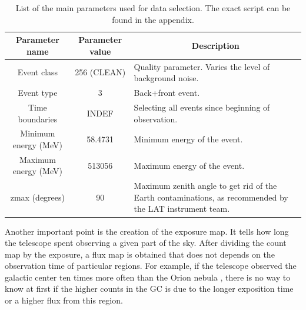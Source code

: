 \begin{center}
\begin{table}[h]
\centering
\begin{tabular}{|c|c|p{6.5cm}|}
\hline
\multicolumn{1}{|c|}{\textbf{Parameter name}} & \textbf{Parameter value} & \multicolumn{1}{c|}{\textbf{Description}}                                                                   \\ \hline
Event class                         & 256 (CLEAN)              & Quality parameter. Varies the level of background noise.                                                    \\ \hline
Event type                          & 3                        & Back+front event.                                                                                           \\ \hline
Time boundaries                     & INDEF                    & Selecting all events since beginning of observation.                                                        \\ \hline
Minimum energy (MeV)                & 58.4731                  & Minimum energy of the event.                                                                                \\ \hline
Maximum energy (MeV)                & 513056                   & Maximum energy of the event.                                                                                \\ \hline
zmax (degrees)                      & 90                       & Maximum zenith angle to get rid of the Earth contaminations, as recommended by the LAT instrument team. \\ \hline
\end{tabular}
\caption{List of the main parameters used for data selection. The exact script can be found in the appendix.}
\label{tab:fermi_selection_parameters}
\end{table}
\end{center}


Another important point is the creation of the exposure map. It tells how long the telescope spent observing a given part of the sky. After dividing the count map by the exposure, a flux map is obtained that does not depends on the observation time of particular regions. For example, if the telescope observed the galactic center ten times more often than the Orion nebula , there is no way to know at first if the higher counts in the GC is due to the longer exposition time or a higher flux from this region.

